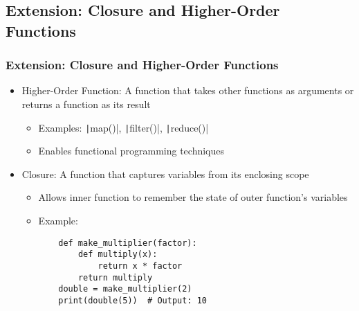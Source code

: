 \documentclass{beamer}
\newcommand{\python}[1]{\texttt|#1|}
\begin{document}
\subsection{Extension: Closure and Higher-Order Functions}
\begin{frame}[fragile]
    \frametitle{Extension: Closure and Higher-Order Functions}
    \begin{itemize}
        \item Higher-Order Function: A function that takes other functions as arguments or returns a function as its result
              \begin{itemize}
                  \item Examples: \python{map()}, \python{filter()}, \python{reduce()}
                  \item Enables functional programming techniques
              \end{itemize}
        \item Closure: A function that captures variables from its enclosing scope
              \begin{itemize}
                  \item Allows inner function to remember the state of outer function's variables
                  \item Example:
                        \begin{verbatim}
    def make_multiplier(factor):
        def multiply(x):
            return x * factor
        return multiply
    double = make_multiplier(2)
    print(double(5))  # Output: 10
                        \end{verbatim}
              \end{itemize}
    \end{itemize}
\end{frame}
\end{document}
